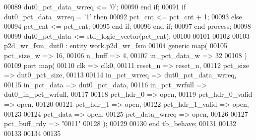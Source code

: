 \begin{DoxyCode}
00089             \textcolor{vhdlchar}{dut0_pct_data_wrreq} \textcolor{vhdlchar}{<=} \textcolor{vhdlchar}{'}\textcolor{vhdllogic}{}\textcolor{vhdllogic}{0}\textcolor{vhdlchar}{'};
00090          \textcolor{keywordflow}{end} \textcolor{keywordflow}{if};
00091          \textcolor{keywordflow}{if} \textcolor{vhdlchar}{dut0_pct_data_wrreq} \textcolor{vhdlchar}{=} \textcolor{vhdlchar}{'}\textcolor{vhdllogic}{}\textcolor{vhdllogic}{1}\textcolor{vhdlchar}{'} \textcolor{keywordflow}{then} 
00092             \textcolor{vhdlchar}{pct_cnt} \textcolor{vhdlchar}{<=} \textcolor{vhdlchar}{pct_cnt} \textcolor{vhdlchar}{+} \textcolor{vhdllogic}{}\textcolor{vhdllogic}{1};
00093          \textcolor{keywordflow}{else} 
00094             \textcolor{vhdlchar}{pct_cnt} \textcolor{vhdlchar}{<=} \textcolor{vhdlchar}{pct_cnt};
00095          \textcolor{keywordflow}{end} \textcolor{keywordflow}{if};
00096         \textcolor{keywordflow}{end} \textcolor{keywordflow}{if};
00097     \textcolor{keywordflow}{end} \textcolor{keywordflow}{process};
00098     
00099     \textcolor{vhdlchar}{dut0_pct_data}  \textcolor{vhdlchar}{<=} \textcolor{comment}{std\_logic\_vector}\textcolor{vhdlchar}{(}\textcolor{vhdlchar}{pct_cnt}\textcolor{vhdlchar}{)};
00100    
00101 
00102   
00103   p2d\_wr\_fsm\_dut0 : \textcolor{keywordflow}{entity} work.p2d_wr_fsm
00104    \textcolor{keywordflow}{generic} \textcolor{keywordflow}{map}(
00105       pct_size_w        => \textcolor{vhdllogic}{16},
00106       n_buff            => \textcolor{vhdllogic}{4},
00107       in_pct_data_w     => \textcolor{vhdllogic}{32}
00108    \textcolor{vhdlchar}{)}
00109    \textcolor{keywordflow}{port} \textcolor{keywordflow}{map}(
00110       clk               => clk0,
00111       reset_n           => reset_n,
00112       pct_size          => dut0_pct_size, 
00113       
00114       in_pct_wrreq      => dut0_pct_data_wrreq,
00115       in_pct_data       => dut0_pct_data,
00116       in_pct_wrfull     => dut0_in_pct_wrfull,
00117 
00118       pct_hdr_0         => \textcolor{keywordflow}{open},
00119       pct_hdr_0_valid   => \textcolor{keywordflow}{open},
00120 
00121       pct_hdr_1         => \textcolor{keywordflow}{open},
00122       pct_hdr_1_valid   => \textcolor{keywordflow}{open},
00123       
00124       pct_data          => \textcolor{keywordflow}{open},
00125       pct_data_wrreq    => \textcolor{keywordflow}{open},
00126       
00127       pct_buff_rdy      => "\textcolor{vhdllogic}{0011}"
00128       \textcolor{vhdlchar}{)};
00129     
00130     \textcolor{keywordflow}{end} \textcolor{vhdlchar}{tb\_behave};
00131   
00132   
00133 
00134 
00135   
\end{DoxyCode}
